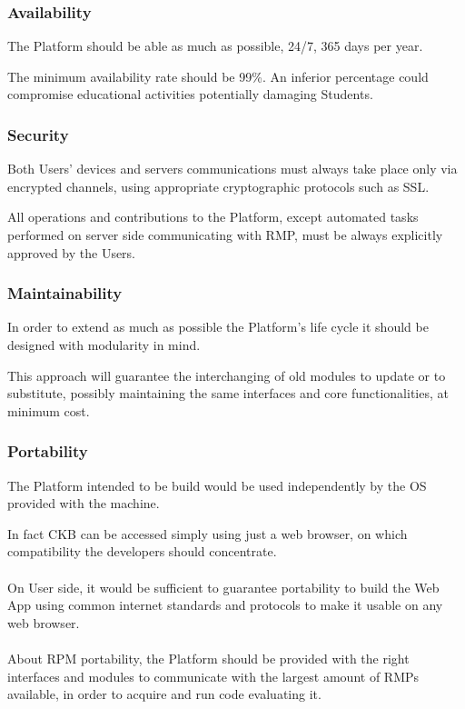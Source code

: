 \subsubsection{Availability}
The Platform should be able as much as possible, 24/7, 365 days per year. 

The minimum availability rate should be 99\%. An inferior percentage could compromise educational activities potentially damaging Students.

\subsubsection{Security}
Both Users' devices and servers communications must always take place only via encrypted channels, using appropriate cryptographic protocols such as SSL. 

All operations and contributions to the Platform, except automated tasks performed on server side communicating with RMP, must be always explicitly approved by the Users.

\subsubsection{Maintainability}
In order to extend as much as possible the Platform's life cycle it should be designed with modularity in mind. 

This approach will guarantee the interchanging of old modules to update or to substitute, possibly maintaining the same interfaces and core functionalities, at minimum cost.

\subsubsection{Portability}
The Platform intended to be build would be used independently by the OS provided with the machine. 

In fact CKB can be accessed simply using just a web browser, on which compatibility the developers should concentrate.\\ 
\\
On User side, it would be sufficient to guarantee portability to build the Web App using common internet standards and protocols to make it usable on any web browser.\\
\\
About RPM portability, the Platform should be provided with the right interfaces and modules to communicate with the largest amount of RMPs available, in order to acquire and run code evaluating it.